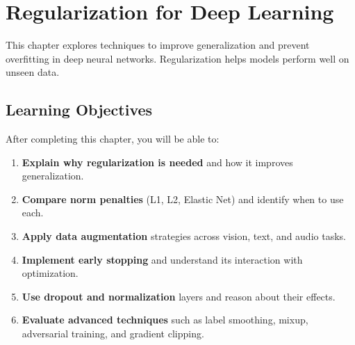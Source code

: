 
\chapter{Regularization for Deep Learning}
\label{chap:regularization}

This chapter explores techniques to improve generalization and prevent overfitting in deep neural networks. Regularization helps models perform well on unseen data.


\section*{Learning Objectives}
\label{sec:ch7-learning-objectives}

After completing this chapter, you will be able to:

\begin{enumerate}
    \item \textbf{Explain why regularization is needed} and how it improves generalization.
    \item \textbf{Compare norm penalties} (L1, L2, Elastic Net) and identify when to use each.
    \item \textbf{Apply data augmentation} strategies across vision, text, and audio tasks.
    \item \textbf{Implement early stopping} and understand its interaction with optimization.
    \item \textbf{Use dropout and normalization} layers and reason about their effects.
    \item \textbf{Evaluate advanced techniques} such as label smoothing, mixup, adversarial training, and gradient clipping.
\end{enumerate}
















